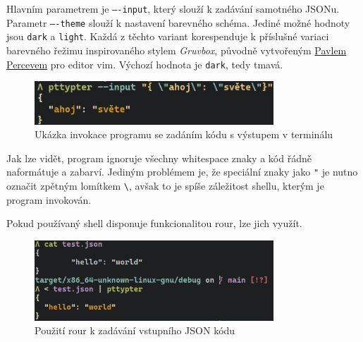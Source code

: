\documentclass[11pt, letterpaper]{article}
\begin{document}
Hlavním parametrem je \texttt{----input}, který slouží k zadávání samotného JSONu. Parametr \texttt{----theme} slouží k nastavení barevného schéma. Jediné možné hodnoty jsou \texttt{dark} a \texttt{light}. Každá z těchto variant korespenduje k příslušné variaci barevného řežimu inspirovaného stylem \textit{Gruvbox}, původně vytvořeným \href{https://github.com/morhetz}{Pavlem Percevem} pro editor vim. Výchozí hodnota je \texttt{dark}, tedy tmavá.
\begin{figure}[H]
    \begin{center}
        \includegraphics[width=0.8\textwidth]{term}
    \end{center}
    \caption{Ukázka invokace programu se zadáním kódu s výstupem v terminálu}
\end{figure}

Jak lze vidět, program ignoruje všechny whitespace znaky a kód řádně naformátuje a zabarví. Jediným problémem je, že speciální znaky jako \texttt{"} je nutno označit zpětným lomítkem \texttt{\textbackslash}, avšak to je spíše záležitost shellu, kterým je program invokován.

Pokud používaný shell disponuje funkcionalitou rour, lze jich využít.
\begin{figure}[H]
    \begin{center}
        \includegraphics[width=0.8\textwidth]{term2}
    \end{center}
    \caption{Použití rour k zadávání vstupního JSON kódu}
\end{figure}
\end{document}
